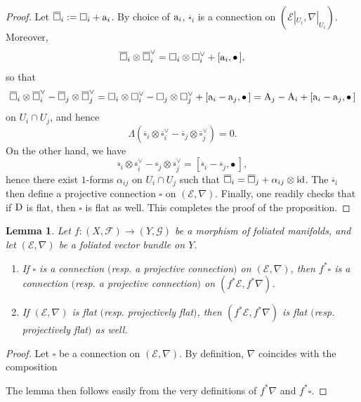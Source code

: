 \documentclass[english,10pt]{amsart}
\newcommand{\cF}{\mathcal{F}}
\newcommand{\cG}{\mathcal{G}}
\newcommand{\sE}{\mathscr{E}}
\newtheorem{lemma}[thm]{Lemma}
\theoremstyle{definition}
\theoremstyle{remark}
\numberwithin{equation}{section}
\begin{document}
\begin{proof}
Let $\overline{\square}_i:=\square_i+\textup{a}_i$. By choice of $\textup{a}_i$, $\overline{\square}_i$ is a connection on $(\sE|_{U_i},\nabla|_{U_i})$. Moreover,
\[
\overline{\square}_i \otimes \overline{\square}_i^\vee = \square_i \otimes \square^\vee_i + [\textup{a}_i,\bullet\,],
\]
so that 
\[
\overline{\square}_i \otimes \overline{\square}_i^\vee - \overline{\square}_j \otimes \overline{\square}_j^\vee= \square_i \otimes \square^\vee_i - \square_j \otimes \square^\vee_j + [\textup{a}_i-\textup{a}_j,\bullet\,]=\textup{A}_j-\textup{A}_i + [\textup{a}_i-\textup{a}_j,\bullet\,]
\]
on $U_i\cap U_j$, and hence
\[
\Lambda ( \overline{\square}_i \otimes \overline{\square}_i^\vee - \overline{\square}_j \otimes \overline{\square}_j^\vee ) = 0.
\]
On the other hand, we have
\[
\overline{\square}_i \otimes \overline{\square}_i^\vee - \overline{\square}_j \otimes \overline{\square}_j^\vee= \left[\overline{\square}_i - \overline{\square}_j,\bullet\,\right],
\]
hence there exist $1$-forms $\alpha_{ij}$ on $U_i\cap U_j$ such that $\overline{\square}_i = \overline{\square}_j + \alpha_{ij} \otimes \textup{id}$. The $\overline{\square}_i$ then define a projective connection $\square$ on $(\sE,\nabla)$. Finally, one readily checks that if $\textup{D}$ is flat, then $\square$ is flat as well. This completes the proof of the proposition.
\end{proof}

\begin{lemma}\label{lemma:functoriality_flatness}
Let $f \colon (X,\cF) \to (Y,\cG)$ be a morphism of foliated manifolds, and let $(\sE,\nabla)$ be a foliated vector bundle on $Y$. 
\begin{enumerate}
\item If $\square$ is a connection $($resp. a projective connection$)$ on $(\sE,\nabla)$, then $f^*\square$ is a connection $($resp. a projective connection$)$ on $(f^*\sE,f^*\nabla)$. 
\item If $(\sE,\nabla)$ is flat $($resp. projectively flat$)$, then $(f^*\sE,f^*\nabla)$ is flat $($resp. projectively flat$)$ as well.
\end{enumerate}
\end{lemma}

\begin{proof}
Let $\square$ be a connection on $(\sE,\nabla)$. By definition, $\nabla$ coincides with the composition 
\begin{center}
\end{center}
The lemma then follows easily from the very definitions of $f^*\nabla$ and $f^*\square$.
\end{proof}
\end{document}
